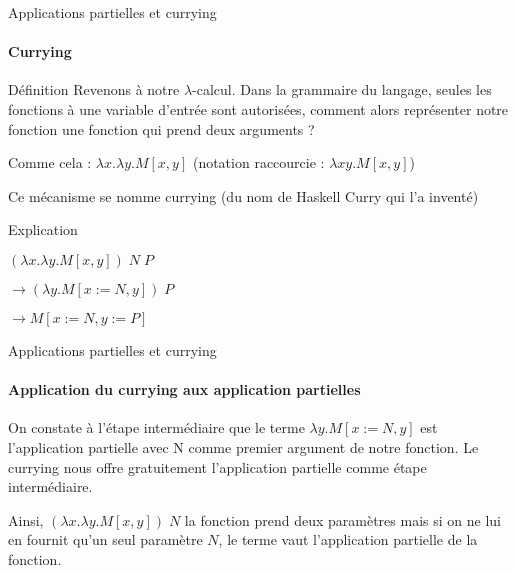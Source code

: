 \documentclass[aspectratio=169]{beamer}
\begin{document}
\begin{frame}[fragile]{Applications partielles et currying}

    \framesubtitle{Currying}

    \begin{block}{Définition}
        Revenons à notre $\lambda$-calcul. Dans la grammaire du langage, seules les fonctions à une variable d'entrée sont autorisées, comment alors représenter notre fonction une fonction qui prend deux arguments ?

        Comme cela : $\lambda x.\lambda y. M[x, y]$ (notation raccourcie : $\lambda xy.M[x, y]$)

        Ce mécanisme se nomme currying (du nom de Haskell Curry qui l'a inventé)

    \end{block}

    \begin{exampleblock}{Explication}
      
        $(\lambda x.\lambda y.M[x,y])\;N\;P$
        
        $\rightarrow (\lambda y.M[x:=N,y])\;P$
        
        $\rightarrow M[x:=N, y:=P]$  
    \end{exampleblock}
    
\end{frame}

\begin{frame}{Applications partielles et currying}

    \framesubtitle{Application du currying aux application partielles}

    On constate à l'étape intermédiaire que le terme $\lambda y.M[x:=N,y]$ est l'application partielle avec N comme premier argument de notre fonction. Le currying nous offre gratuitement l'application partielle comme étape intermédiaire.

    Ainsi, $(\lambda x.\lambda y.M[x,y])\;N$ la fonction prend deux paramètres mais si on ne lui en fournit qu'un seul paramètre $N$, le terme vaut l'application partielle de la fonction.
    
\end{frame}
\end{document}

